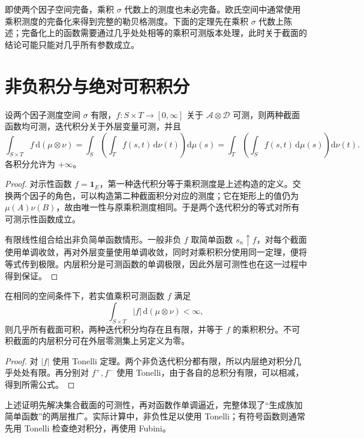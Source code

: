 即使两个因子空间完备，乘积 $\sigma$ 代数上的测度也未必完备。欧氏空间中通常使用乘积测度的完备化来得到完整的勒贝格测度。下面的定理先在乘积 $\sigma$ 代数上陈述；完备化上的函数需要通过几乎处处相等的乘积可测版本处理，此时关于截面的结论可能只能对几乎所有参数成立。

\section{非负积分与绝对可积积分}
\begin{theorem}[Tonelli 定理]
设两个因子测度空间 $\sigma$ 有限，$f:S\times T\to[0,\infty]$ 关于 $\mathcal A\otimes\mathcal D$ 可测，则两种截面函数均可测，迭代积分关于外层变量可测，并且
\begin{equation}
 \int_{S\times T}f\,\mathrm d(\mu\otimes\nu)
 =\int_S\left(\int_T f(s,t)\,\mathrm d\nu(t)\right)\mathrm d\mu(s)
 =\int_T\left(\int_S f(s,t)\,\mathrm d\mu(s)\right)\mathrm d\nu(t).
 \label{eq:mt-tonelli}
\end{equation}
各积分允许为 $+\infty$。
\label{thm:mt-tonelli}
\end{theorem}
\begin{proof}
对示性函数 $f=\mathbf1_E$，第一种迭代积分等于乘积测度是上述构造的定义。交换两个因子的角色，可以构造第二种截面积分对应的测度；它在矩形上的值仍为 $\mu(A)\nu(B)$，故由唯一性与原乘积测度相同。于是两个迭代积分的等式对所有可测示性函数成立。

有限线性组合给出非负简单函数情形。一般非负 $f$ 取简单函数 $s_n\uparrow f$，对每个截面使用单调收敛，再对外层变量使用单调收敛，同时对乘积积分使用同一定理，便将等式传到极限。内层积分是可测函数的单调极限，因此外层可测性也在这一过程中得到保证。
\end{proof}

\begin{theorem}[Fubini 定理]
在相同的空间条件下，若实值乘积可测函数 $f$ 满足
\[
 \int_{S\times T}|f|\,\mathrm d(\mu\otimes\nu)<\infty,
\]
则几乎所有截面可积，两种迭代积分均存在且有限，并等于 $f$ 的乘积积分。不可积截面的内层积分可在外层零测集上另定义为零。
\label{thm:mt-fubini}
\end{theorem}
\begin{proof}
对 $|f|$ 使用 Tonelli 定理。两个非负迭代积分都有限，所以内层绝对积分几乎处处有限。再分别对 $f^+,f^-$ 使用 Tonelli，由于各自的总积分有限，可以相减，得到所需公式。
\end{proof}
上述证明先解决集合截面的可测性，再对函数作单调逼近，完整体现了“生成族加简单函数”的两层推广。实际计算中，非负性足以使用 Tonelli；有符号函数则通常先用 Tonelli 检查绝对积分，再使用 Fubini。

